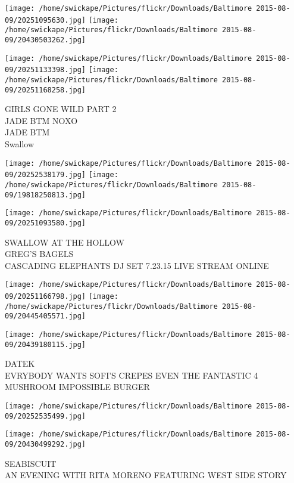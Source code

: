 \documentclass[10pt,letterpaper]{article}
\begin{document}
\texttt{[image: /home/swickape/Pictures/flickr/Downloads/Baltimore 2015-08-09/20251095630.jpg]}
\texttt{[image: /home/swickape/Pictures/flickr/Downloads/Baltimore 2015-08-09/20430503262.jpg]}

\texttt{[image: /home/swickape/Pictures/flickr/Downloads/Baltimore 2015-08-09/20251133398.jpg]}
\texttt{[image: /home/swickape/Pictures/flickr/Downloads/Baltimore 2015-08-09/20251168258.jpg]}

GIRLS GONE WILD PART 2\\
JADE BTM NOXO\\
JADE BTM\\
Swallow
\pagebreak

\texttt{[image: /home/swickape/Pictures/flickr/Downloads/Baltimore 2015-08-09/20252538179.jpg]}
\texttt{[image: /home/swickape/Pictures/flickr/Downloads/Baltimore 2015-08-09/19818250813.jpg]}

\vspace{0.25in}
\texttt{[image: /home/swickape/Pictures/flickr/Downloads/Baltimore 2015-08-09/20251093580.jpg]}

SWALLOW AT THE HOLLOW\\
GREG'S BAGELS\\
CASCADING ELEPHANTS DJ SET 7.23.15 LIVE STREAM ONLINE
\pagebreak

\texttt{[image: /home/swickape/Pictures/flickr/Downloads/Baltimore 2015-08-09/20251166798.jpg]}
\texttt{[image: /home/swickape/Pictures/flickr/Downloads/Baltimore 2015-08-09/20445405571.jpg]}

\texttt{[image: /home/swickape/Pictures/flickr/Downloads/Baltimore 2015-08-09/20439180115.jpg]}

DATEK\\
EVRYBODY WANTS SOFI'S CREPES EVEN THE FANTASTIC 4\\
MUSHROOM IMPOSSIBLE BURGER
\pagebreak

\texttt{[image: /home/swickape/Pictures/flickr/Downloads/Baltimore 2015-08-09/20252535499.jpg]}

\vspace{0.25in}
\texttt{[image: /home/swickape/Pictures/flickr/Downloads/Baltimore 2015-08-09/20430499292.jpg]}

SEABISCUIT\\
AN EVENING WITH RITA MORENO FEATURING WEST SIDE STORY
\pagebreak
\end{document}
